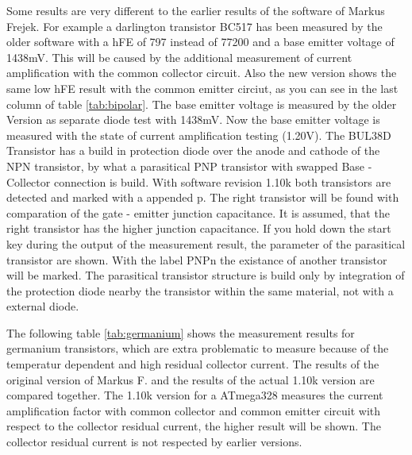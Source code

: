 Some results are very different to the earlier results of the software of Markus Frejek.
For example a darlington transistor BC517 has been measured by the older software
with a hFE of 797 instead of 77200 and a base emitter voltage of 1438mV.
This will be caused by the additional measurement of current amplification with the
common collector circuit.
Also the new version shows the same low hFE result with the common emitter circiut,
as you can see in the last column of table \ref{tab:bipolar}.
The base emitter voltage is measured by the older Version as separate diode test with 1438mV.
Now the base emitter voltage is measured with the state of current amplification testing (1.20V).
The BUL38D Transistor has a build in protection diode over the anode and cathode of the NPN transistor,
by what a parasitical PNP transistor with swapped Base - Collector connection is build.
With software revision 1.10k both transistors are detected and marked
with a appended p.
The right transistor will be found with comparation of the gate - emitter junction capacitance.
It is assumed, that the right transistor has the higher junction capacitance.
If you hold down the start key during the output of the measurement result, the parameter of
the parasitical transistor are shown. With the label PNPn the existance of another transistor will be marked.
The parasitical transistor structure is build only by integration of the protection diode nearby
the transistor within the same material, not with a external diode.

The following table \ref{tab:germanium} shows the measurement results for germanium transistors, which are extra problematic
to measure because of the temperatur dependent and high residual collector current.
The results of the original version of Markus F. and the results of the actual 1.10k version are
compared together. The 1.10k version for a ATmega328 measures the current amplification factor with
common collector and common emitter circuit with respect to the collector residual current,
the higher result will be shown.
The collector residual current is not respected by earlier versions.

